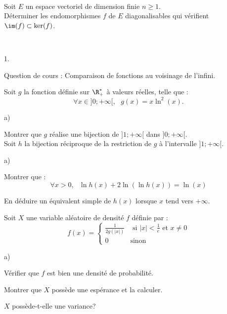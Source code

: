 \documentclass[11pt]{article}%
\begin{document}
\begin{exerciceSP}~\\
  Soit $E$ un espace vectoriel de dimension finie $n \geq 1$. \\
  Déterminer les endomorphismes $f$ de $E$ diagonalisables qui
  vérifient $\im(f) \subset \ker(f)$.
\end{exerciceSP}




\begin{exerciceAP}~
  \begin{noliste}{1.}
    \setlength{\itemsep}{2mm}
  \item Question de cours : Comparaison de fonctions au voisinage de l'infini.
  \item Soit $g$ la fonction définie sur $\R_+^*$ à valeurs réelles, telle que :
    \[
    \forall x \in ] 0 ; +\infty[,\ \ \ g(x) = x \ln^2 (x).
    \]
    \begin{noliste}{a)}
    \setlength{\itemsep}{2mm} 
    \item Montrer que $g$ réalise une bijection de $] 1 ; +\infty[$
      dans $] 0 ; +\infty[$. \\
      Soit $h$ la bijection réciproque de la restriction de $g$ à
      l'intervalle $]1 ; +\infty[$.
    \item
      \begin{noliste}{a)}
    \setlength{\itemsep}{2mm}
      \item Montrer que :
        \[
        \forall x > 0,\ \ \ \ln h(x) + 2 \ln ( \ln h(x) ) = \ln (x)
        \]
      \item En déduire un équivalent simple de $h(x)$ lorsque $x$ tend
        vers $+\infty$.
      \end{noliste}
    \end{noliste}
  \item Soit $X$ une variable aléatoire de densité $f$ définie par :
    \[
    f(x) = \left\{ 
      \begin{array}{ll} 
        \frac{1}{2 g (\vert x \vert)} & \text{ si } \vert x \vert <
        \frac{1}{e} \text{ et } x \neq 0 \\ 
        0 & \text{sinon} 
      \end{array} \right.
    \]
    \begin{noliste}{a)}
    \setlength{\itemsep}{2mm}
    \item Vérifier que $f$ est bien une densité de probabilité.
    \item Montrer que $X$ possède une espérance et la calculer.
    \item $X$ possède-t-elle une variance? \\
    \end{noliste}
  \end{noliste}
\end{exerciceAP}
\end{document}

